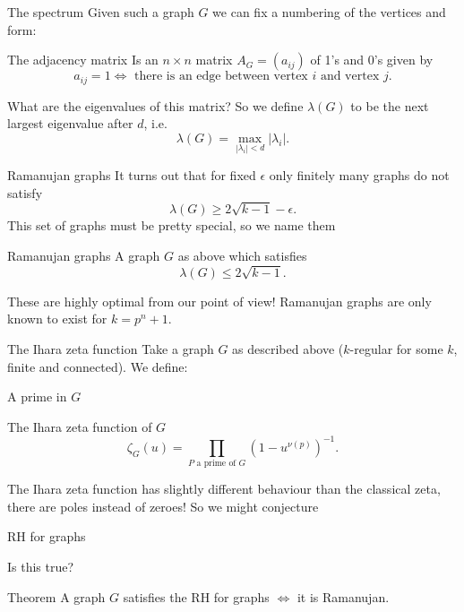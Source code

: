 \documentclass{beamer}
\begin{document}
\begin{frame}{The spectrum}
Given such a graph $G$ we can fix a numbering of the vertices and form:
\begin{block}{The adjacency matrix}
Is an $n\times n$ matrix $A_G = (a_{ij})$ of 1's and 0's given by
\[a_{ij} = 1 \iff \text{ there is an edge between vertex $i$ and vertex $j$}.\]
\end{block}
\pause What are the eigenvalues of this matrix? 
\pause So we define $\lambda(G)$ to be the next largest eigenvalue after $d$, i.e.
\[\lambda(G) = \max_{|\lambda_i| < d} |\lambda_i|.\]

\end{frame}

\begin{frame}{Ramanujan graphs}
It turns out that for fixed $\epsilon$ only finitely many graphs do not satisfy 
\[\lambda(G) \ge 2\sqrt{k-1} - \epsilon.\]
\pause This set of graphs must be pretty special, so we name them
\begin{block}{Ramanujan graphs}
A graph $G$ as above which satisfies
\[\lambda(G) \le 2\sqrt{k-1}.\]
\end{block}
These are highly optimal from our point of view!
\pause Ramanujan graphs are only known to exist for $k = p^n + 1$.
\end{frame}

\begin{frame}{The Ihara zeta function}
Take a graph $G$ as described above ($k$-regular for some $k$, finite and connected).
We define:
\begin{block}{A prime in $G$}

\end{block}
\pause \begin{block}{The Ihara zeta function of $G$}
\[\zeta_G(u) = \prod_{P\text{ a prime of } G} \left(1-u^{\nu(p)}\right)^{-1}.\]
\end{block}
\end{frame}

\begin{frame}
The Ihara zeta function has slightly different behaviour than the classical zeta, there are poles instead of zeroes!
\pause So we might conjecture
\begin{block}{RH for graphs}

\end{block}
\pause Is this true?
\begin{block}{Theorem}
A graph $G$ satisfies the RH for graphs $\iff$ it is Ramanujan.
\end{block}
\end{frame}
\end{document}
